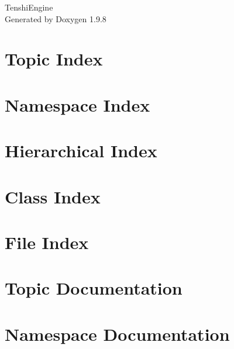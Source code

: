 \documentclass[twoside]{book}
\newcommand{\+}{\discretionary{\mbox{\scriptsize$\hookleftarrow$}}{}{}}
\newcommand{\clearemptydoublepage}{%
    \newpage{\pagestyle{empty}\cleardoublepage}%
  }
\begin{document}
  \raggedbottom
    \hypersetup{pageanchor=false,
                bookmarksnumbered=true,
                pdfencoding=unicode
               }
  \begin{titlepage}
  \vspace*{7cm}
  \begin{center}%
  {\Large Tenshi\+Engine}\\
  \vspace*{1cm}
  {\large Generated by Doxygen 1.9.8}\\
  \end{center}
  \end{titlepage}
  \clearemptydoublepage
  \tableofcontents
  \clearemptydoublepage
  \hypersetup{pageanchor=true}

\chapter{Topic Index}

\chapter{Namespace Index}

\chapter{Hierarchical Index}

\chapter{Class Index}

\chapter{File Index}

\chapter{Topic Documentation}

\chapter{Namespace Documentation}




\end{document}
